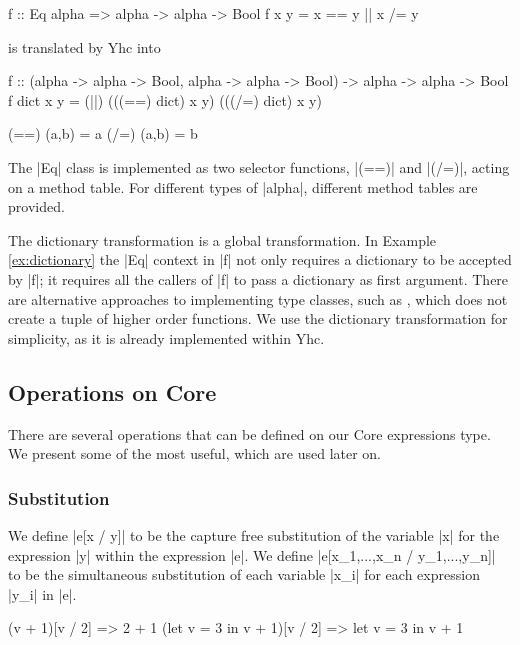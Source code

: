 \begin{example}
\label{ex:dictionary}
\begin{code}
f :: Eq alpha => alpha -> alpha -> Bool
f x y = x == y || x /= y
\end{code}

\noindent is translated by Yhc into

\begin{code}
f :: (alpha -> alpha -> Bool, alpha -> alpha -> Bool) -> alpha -> alpha -> Bool
f dict x y = (||) (((==) dict) x y) (((/=) dict) x y)

(==) (a,b) = a
(/=) (a,b) = b
\end{code}

The |Eq| class is implemented as two selector functions, |(==)| and |(/=)|, acting on a method table. For different types of |alpha|, different method tables are provided.
\end{example}

The dictionary transformation is a global transformation. In Example \ref{ex:dictionary} the |Eq| context in |f| not only requires a dictionary to be accepted by |f|; it requires all the callers of |f| to pass a dictionary as first argument. There are alternative approaches to implementing type classes, such as \citet{jones:dictionary_free}, which does not create a tuple of higher order functions. We use the dictionary transformation for simplicity, as it is already implemented within Yhc.

\subsection{Operations on Core}

There are several operations that can be defined on our Core expressions type. We present some of the most useful, which are used later on.

\subsubsection{Substitution}

We define |e[x / y]| to be the capture free substitution of the variable |x| for the expression |y| within the expression |e|. We define |e[x_1,...,x_n / y_1,...,y_n]| to be the simultaneous substitution of each variable |x_i| for each expression |y_i| in |e|.

\begin{example}
\begin{code}
(v + 1)[v / 2]               => 2 + 1
(let v = 3 in v + 1)[v / 2]  => let v = 3 in v + 1
\end{code}
\end{example}

